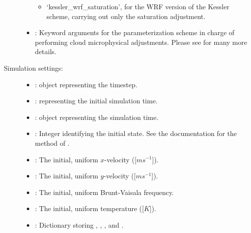 \documentclass[letterpaper,10pt,english]{sphinxmanual}
\begin{document}
\begin{description}
\begin{itemize}
\begin{itemize}
\item {} 
‘kessler\_wrf\_saturation’, for the WRF version of the Kessler scheme,                          carrying out only the saturation adjustment.

\end{itemize}

\item {} 
: Keyword arguments for the parameterization scheme          in charge of performing cloud microphysical adjustments. Please see              for many more details.

\end{itemize}

\item[{Simulation settings:}] \leavevmode\begin{itemize}
\item {} 
:  object representing the timestep.

\item {} 
:  representing the initial simulation time.

\item {} 
:  object representing the simulation time.

\item {} 
: Integer identifying the initial state. See the documentation for the method             of              .

\item {} 
: The initial, uniform \(x\)-velocity ({[}\(m s^{-1}\){]}).

\item {} 
: The initial, uniform \(y\)-velocity ({[}\(m s^{-1}\){]}).

\item {} 
: The initial, uniform Brunt-Vaisala frequency.

\item {} 
: The initial, uniform temperature ({[}\(K\){]}).

\item {} 
: Dictionary storing ,            , ,                and .


\end{itemize}
\end{description}
\end{document}
